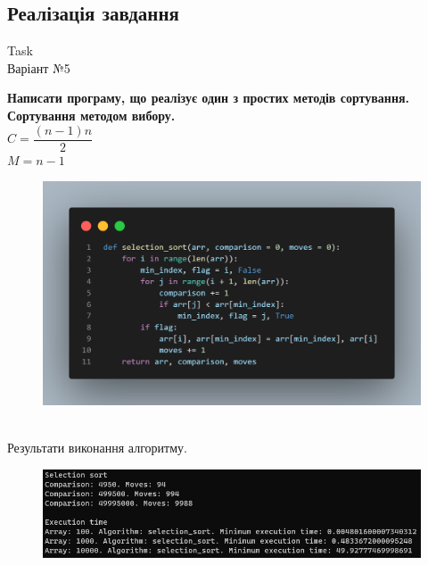 \documentclass[a4paper,12pt]{article}
\newcommand{\RomanNumeralCaps}[1]{\MakeUppercase{\romannumeral #1}}
\begin{document}
\newpage
    \begin{center}
        \section*{\bfseries{Реалізація завдання}}
    \end{center}
    \begin{center}
        \Large{Task \RomanNumeralCaps{1}} \\
        \Large{Варіант №5}
    \end{center}
    \textbf{Написати програму, що реалізує один з простих методів сортування.
    Сортування методом вибору.} \\
    $C=\dfrac{(n-1)n}{2}$ \\
    $M=n-1$
    \begin{figure}[h!]
        \begin{minipage}[h]{1\linewidth}
            \centering
            \includegraphics[width=1\linewidth]{Prt sc/Figure_1.png}  
        \end{minipage}
    \end{figure} \\
    Результати виконання алгоритму.
    \begin{figure}[h!]
        \begin{minipage}[h]{1\linewidth}
            \centering
            \includegraphics[width=1\linewidth]{Prt sc/Figure_2.png}
        \end{minipage}
    \end{figure}
\end{document}
